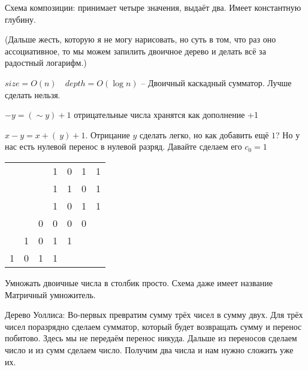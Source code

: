 \documentclass{book}
\theoremstyle{definition}
\begin{document}
Схема композиции: принимает четыре значения, выдаёт два. Имеет константную глубину.

(Дальше жесть, которую я не могу нарисовать, но суть в том, что раз оно ассоциативное, то мы можем запилить двоичное дерево и делать всё за радостный логарифм.)

$size=O(n)\quad depth = O(\log n)$ -- Двоичный каскадный сумматор. Лучше сделать нельзя.

$-y = (\sim y)+1$ отрицательные числа хранятся как дополнение +1

$x-y = x+(~y)+1$. Отрицание  $y$ сделать легко, но как добавить ещё $1$? Но у нас есть нулевой перенос в нулевой разряд. Давайте сделаем его $c_0=1$

\begin{tabular}{ccccccc}
    &&&1&0&1&1\\
    &&&1&1&0&1\\
    \hline
    &&&1&0&1&1\\
    &&0&0&0&0&\\
    &1&0&1&1&&\\
    1&0&1&1&&&\\\hline
\end{tabular}

Умножать двоичные числа в столбик просто. Схема даже имеет название Матричный умножитель.

Дерево Уоллиса: 
Во-первых превратим сумму трёх чисел в сумму двух. Для трёх чисел поразрядно сделаем сумматор, который будет возвращать сумму и перенос побитово. Здесь мы не передаём перенос никуда. Дальше из переносов сделаем число и из сумм сделаем число. Получим два числа и нам нужно сложить уже их.
 
\end{document}
